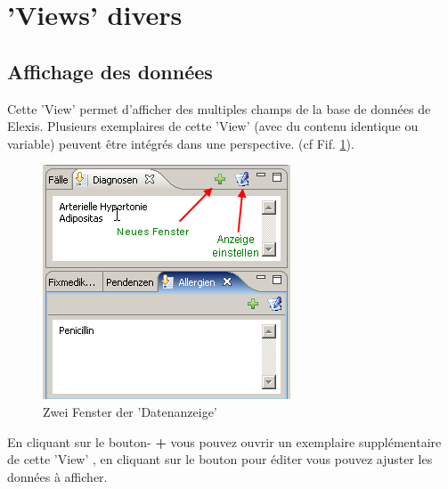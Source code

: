 
\section{'Views' divers}

\subsection{Affichage des données}
Cette 'View' permet d'afficher des multiples champs de la base de données de Elexis. Plusieurs exemplaires de cette 'View' (avec du contenu identique ou variable) peuvent être intégrés dans une perspective.  (cf Fif. \ref{figure1}).
\begin{figure}[hb]
\includegraphics{images/data1}
\caption{Zwei Fenster der 'Datenanzeige'}
\label {figure1}
\end{figure}
En cliquant sur le bouton- \textbf{+} vous pouvez ouvrir un exemplaire supplémentaire de cette 'View' , en cliquant sur le bouton pour éditer vous pouvez ajuster les données à afficher.

